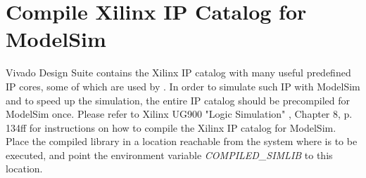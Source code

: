 \section{Compile Xilinx IP Catalog for ModelSim}\label{sec:compile_simlib}%
Vivado Design Suite contains the Xilinx IP catalog with many useful predefined IP cores, some of which are used by \tapasco{}.
In order to simulate such IP with ModelSim \cite{modelsim} and to speed up the simulation, the entire IP catalog should be precompiled for ModelSim once.
Please refer to Xilinx UG900 "Logic Simulation" \cite{ug900-2014.3}, Chapter 8, p. 134ff for instructions on how to compile the Xilinx IP catalog for ModelSim.
Place the compiled library in a location reachable from the system where \tapasco{} is to be executed, and point the environment variable \emph{COMPILED\_SIMLIB} to this location.

